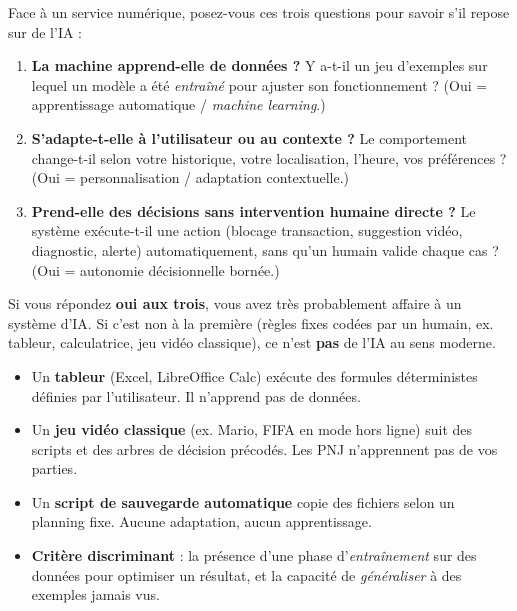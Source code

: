 \documentclass[11pt]{article}
\begin{document}
\begin{methode}
Face à un service numérique, posez-vous ces trois questions pour savoir s'il repose sur de l'IA :
\begin{enumerate}
    \item \textbf{La machine apprend-elle de données ?} Y a-t-il un jeu d'exemples sur lequel un modèle a été \emph{entraîné} pour ajuster son fonctionnement ? (Oui = apprentissage automatique / \emph{machine learning}.)
    \item \textbf{S'adapte-t-elle à l'utilisateur ou au contexte ?} Le comportement change-t-il selon votre historique, votre localisation, l'heure, vos préférences ? (Oui = personnalisation / adaptation contextuelle.)
    \item \textbf{Prend-elle des décisions sans intervention humaine directe ?} Le système exécute-t-il une action (blocage transaction, suggestion vidéo, diagnostic, alerte) automatiquement, sans qu'un humain valide chaque cas ? (Oui = autonomie décisionnelle bornée.)
\end{enumerate}
Si vous répondez \textbf{oui aux trois}, vous avez très probablement affaire à un système d'IA. Si c'est non à la première (règles fixes codées par un humain, ex. tableur, calculatrice, jeu vidéo classique), ce n'est \textbf{pas} de l'IA au sens moderne.
\end{methode}

\begin{attention}
\begin{itemize}
    \item Un \textbf{tableur} (Excel, LibreOffice Calc) exécute des formules déterministes définies par l'utilisateur. Il n'apprend pas de données.
    \item Un \textbf{jeu vidéo classique} (ex. Mario, FIFA en mode hors ligne) suit des scripts et des arbres de décision précodés. Les PNJ n'apprennent pas de vos parties.
    \item Un \textbf{script de sauvegarde automatique} copie des fichiers selon un planning fixe. Aucune adaptation, aucun apprentissage.
    \item \textbf{Critère discriminant} : la présence d'une phase d'\emph{entraînement} sur des données pour optimiser un résultat, et la capacité de \emph{généraliser} à des exemples jamais vus.
\end{itemize}
\end{attention}
\end{document}
